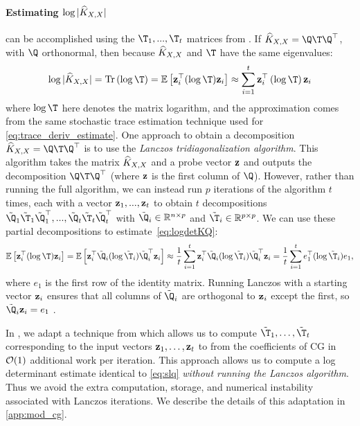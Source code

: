 \paragraph{Estimating $\log \vert \widehat{K}_{X,X} \vert$}
can be accomplished using the $\T_{1},...,\T_{t}$ matrices from \mcgacro{}. If $\trainK=\Q\T\Q^{\top}$, with $\Q$ orthonormal, then because $\widehat{K}_{X,X}$ and $\T$ have the same eigenvalues:
\begin{equation}
  \log \vert \trainK \vert = \tr{\log \T}  = \Ev{\bz_i^\top (\log \T)\bz_i} \approx \sum_{i=1}^{t}\bz_{i}^\top \left( \log \T \right) \bz_{i}\label{eq:logdetKQ}
\end{equation}
where $\log \T$ here denotes the matrix logarithm, and the approximation comes from the same stochastic trace estimation technique used for \eqref{eq:trace_deriv_estimate}. One approach to obtain a decomposition $\trainK=\Q\T\Q^{\top}$ is to use the \emph{Lanczos tridiagonalization algorithm}. This algorithm takes the matrix $\widehat{K}_{X,X}$ and a probe vector $\mathbf{z}$ and outputs the decomposition $\Q\T\Q^{\top}$ (where $\mathbf{z}$ is the first column of $\Q$). However, rather than running the full algorithm, we can instead run $p$ iterations of the algorithm $t$ times, each with a vector $\mathbf{z}_{1},...,\mathbf{z}_{t}$ to obtain $t$ decompositions  $\tilde{\Q}_{1}\tilde{\T}_{1}\tilde{\Q}_{1}^{\top},...,\tilde{\Q}_{t}\tilde{\T}_{t}\tilde{\Q}_{t}^{\top}$ with $\tilde{\Q}_{i} \in \reals^{n \times p}$ and $\tilde{\T}_{i} \in \reals^{p \times p}$. We can use these partial decompositions to estimate~\eqref{eq:logdetKQ}:
\begin{equation}
  \Ev{\bz_i^\top (\log \T)\bz_i} = \Ev{\bz_i^\top  \tilde{\Q}_{i}(\log \tilde{\T}_{i}) \tilde{\Q}_{i}^{\top}\bz_{i}} \approx \frac{1}{t} \sum_{i=1}^{t} \bz_i^{\top} \tilde{\Q}_{i}(\log \tilde{\T}_{i})\tilde{\Q}_{i}^{\top}\bz_{i} = \frac{1}{t} \sum_{i=1}^{t}e_{1}^{\top}(\log \tilde{\T}_{i})e_{1},
  \label{eq:slq}
\end{equation}
where $e_{1}$ is the first row of the identity matrix. Running Lanczos with a starting vector $\mathbf{z}_{i}$ ensures that all columns of $\tilde{\Q}_{i}$ are orthogonal to $\mathbf{z}_{i}$ except the first, so $\tilde{\Q}_{i}\bz_{i} = e_{1}$ \cite{dong2017scalable,ubaru2017fast,golub2009matrices}.

In \mcgacro{}, we adapt a technique from \citet{saad2003iterative} which allows us to compute $\tilde{\T}_{1},\ldots,\tilde{\T}_{t}$ corresponding to the input vectors $\mathbf{z}_{1},\ldots,\mathbf{z}_{t}$  to \mcgacro{} from the coefficients of CG in $\bigo{1}$ additional work per iteration.
This approach allows us to compute a log determinant estimate identical to \eqref{eq:slq} \emph{without running the Lanczos algorithm}.
Thus we avoid the extra computation, storage, and numerical instability associated with Lanczos iterations.
We describe the details of this adaptation in \autoref{app:mod_cg}.

